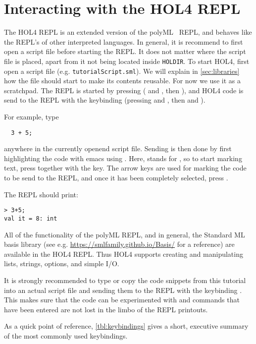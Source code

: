 \section{Interacting with the HOL4 REPL}

The HOL4 REPL is an extended version of the polyML~\cite{polymlweb} REPL, and
behaves like the REPL's of other interpreted languages.
In general, it is recommend to first open a script file before starting
the REPL.
It does not matter where the script file is placed, apart from it not being
located inside \texttt{HOLDIR}. To start HOL4, first open a script file (e.g. \texttt{tutorialScript.sml}).
We will explain in \autoref{sec:libraries} how the file should start to make its
contents reusable. For now we use it as a scratchpad.
The REPL is started by pressing  ( and , then ),
and HOL4 code is send to the REPL with the keybinding 
(pressing  and , then  and ).

For example, type
\begin{lstlisting}
  3 + 5;
\end{lstlisting}

anywhere in the currently openend script file.
Sending is then done by first highlighting the code with emacs using .
Here,  stands for , so to start marking text, press
 together with the  key.
The arrow keys are used for marking the code to be send to the REPL, and once it
has been completely selected, press .

The REPL should print:
\begin{lstlisting}[frame=single]
> 3+5;
val it = 8: int
\end{lstlisting}

All of the functionality of the polyML REPL, and in general, the Standard ML
basis library (see e.g. \url{https://smlfamily.github.io/Basis/} for a reference)
are available in the HOL4 REPL.
Thus HOL4 supports creating and manipulating lists, strings, options, and
simple I/O.

It is strongly recommended to type or copy the code snippets from this tutorial
into an actual script file and sending them to the REPL with the keybinding .
This makes sure that the code can be experimented with and commands that have
been entered are not lost in the limbo of the REPL printouts.

As a quick point of reference, \autoref{tbl:keybindings} gives a short,
executive summary of the most commonly used keybindings.

